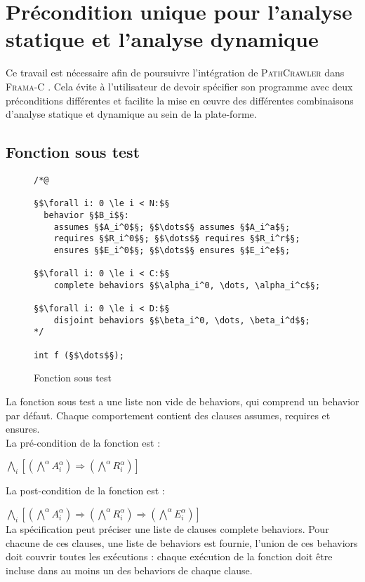
\chapter{Précondition unique pour l'analyse statique et l'analyse dynamique}

Ce travail est nécessaire afin de poursuivre l'intégration de
\textsc{PathCrawler} \cite{PathCrawler} dans \textsc{Frama-C} \cite{Frama-C}.
Cela évite à l'utilisateur de devoir spécifier son programme avec deux
préconditions différentes et facilite la mise en \oe{}uvre des différentes
combinaisons d'analyse statique et dynamique au sein de la plate-forme.

\section{Fonction sous test}


\begin{figure}[h]
  \begin{lstlisting}
/*@

§$\forall i: 0 \le i < N:$§
  behavior §$B_i$§:
    assumes §$A_i^0$§; §$\dots$§ assumes §$A_i^a$§;
    requires §$R_i^0$§; §$\dots$§ requires §$R_i^r$§;
    ensures §$E_i^0$§; §$\dots$§ ensures §$E_i^e$§;

§$\forall i: 0 \le i < C:$§
    complete behaviors §$\alpha_i^0, \dots, \alpha_i^c$§;

§$\forall i: 0 \le i < D:$§
    disjoint behaviors §$\beta_i^0, \dots, \beta_i^d$§;
*/

int f (§$\dots$§);
  \end{lstlisting}
  \caption{Fonction sous test}
\end{figure}


La fonction sous test a une liste non vide de behaviors, qui comprend un
behavior par défaut. Chaque comportement contient des clauses assumes, requires
et ensures.\\

La pré-condition de la fonction est :

$\bigwedge_i [ (\bigwedge^\alpha A_i^\alpha) \Longrightarrow
(\bigwedge^\alpha R_i^\alpha) ]$

La post-condition de la fonction est :

$\bigwedge_i [ (\bigwedge^\alpha A_i^\alpha) \Longrightarrow
(\bigwedge^\alpha R_i^\alpha) \Longrightarrow
(\bigwedge^\alpha E_i^\alpha) ]$\\

La spécification peut préciser une liste de clauses complete behaviors.
Pour chacune de ces clauses, une liste de behaviors est fournie, l'union de ces
behaviors doit couvrir toutes les exécutions : chaque exécution de la fonction
doit être incluse dans au moins un des behaviors de chaque clause.\\

